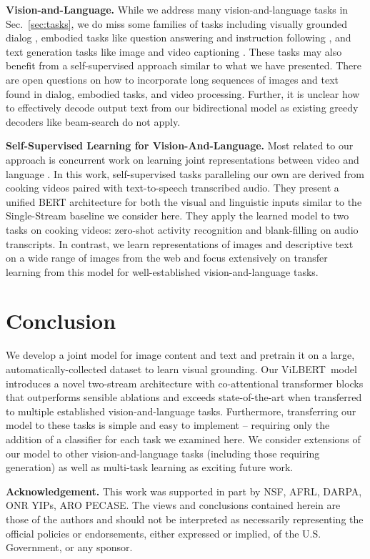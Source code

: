 \textbf{Vision-and-Language.} While we address many vision-and-language tasks in Sec.~\ref{sec:tasks}, we do miss some families of tasks including visually grounded dialog \cite{visualdialog,modulating_vision}, embodied tasks like question answering \cite{embodiedqa} and instruction following \cite{mattersim}, and text generation tasks like image and video captioning \cite{cococaption}. These tasks may also benefit from a self-supervised approach similar to what we have presented. There are open questions on how to incorporate long sequences of images and text found in dialog, embodied tasks, and video processing. Further, it is unclear how to effectively decode output text from our bidirectional model as existing greedy decoders like beam-search do not apply. 

\textbf{Self-Supervised Learning for Vision-And-Language.} Most related to our approach is concurrent work on learning joint representations between video and language \cite{sun2019videobert}. In this work, self-supervised tasks paralleling our own are derived from cooking videos paired with text-to-speech transcribed audio. They present a unified BERT architecture for both the visual and linguistic inputs similar to the Single-Stream baseline we consider here. They apply the learned model to two tasks on cooking videos: zero-shot activity recognition and blank-filling on audio transcripts. In contrast, we learn representations of images and descriptive text on a wide range of images from the web and focus extensively on transfer learning from this model for well-established vision-and-language tasks.

\section{Conclusion}
\label{sec:conc}

We develop a joint model for image content and text and pretrain it on a large, automatically-collected dataset to learn visual grounding. Our ViLBERT~model introduces a novel two-stream architecture with co-attentional transformer blocks that outperforms sensible ablations and exceeds state-of-the-art when transferred to multiple established vision-and-language tasks. Furthermore, transferring our model to these tasks is simple and easy to implement -- requiring only the addition of a classifier for each task we examined here. We consider extensions of our model to other vision-and-language tasks (including those requiring generation) as well as multi-task learning as exciting future work.

\footnotesize{
\textbf{Acknowledgement.} This work was supported in part by NSF, AFRL, DARPA, ONR YIPs, ARO PECASE. The views and conclusions contained herein are those of the authors and should not be interpreted as necessarily representing the official policies or endorsements, either expressed or implied, of the U.S. Government, or any sponsor.}


